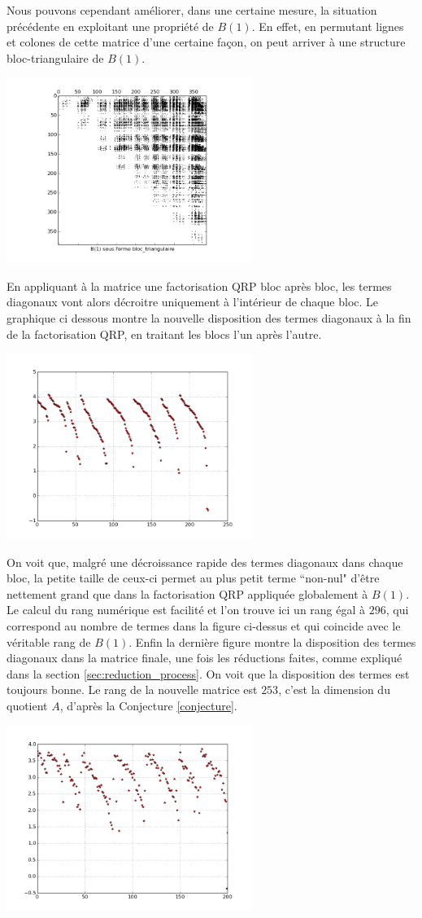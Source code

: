 \documentclass{standalone}
\begin{document}
Nous pouvons cependant améliorer, dans une certaine mesure, la situation précédente en exploitant une propriété de $B(1)$. En effet, en permutant lignes et colones de cette matrice d'une certaine façon, on peut arriver à une structure bloc-triangulaire de $B(1)$.
\begin{center}
\includegraphics[width=8cm]{../png/beztri.png}
\end{center}
En appliquant à la matrice une factorisation QRP bloc après bloc, les termes diagonaux vont alors décroitre uniquement à l'intérieur de chaque bloc. Le graphique ci dessous montre la nouvelle disposition des termes diagonaux à la fin de la factorisation QRP, en traitant les blocs l'un après l'autre.
\begin{center}
\includegraphics[width=8cm]{../png/diagRtri.png}
\end{center}
On voit que, malgré une décroissance rapide des termes diagonaux dans chaque bloc, la petite taille de ceux-ci permet au plus petit terme ``non-nul" d'être nettement grand que dans la factorisation QRP appliquée globalement à $B(1)$. Le calcul du rang numérique est facilité et l'on trouve ici un rang égal à $296$, qui correspond au nombre de termes dans la figure ci-dessus et qui coincide avec le véritable rang de $B(1)$.
Enfin la dernière figure montre la disposition des termes diagonaux dans la matrice finale, une fois les réductions faites, comme expliqué dans la section \ref{sec:reduction_process}. On voit que la disposition des termes est toujours bonne.
 Le rang de la nouvelle matrice est $253$, c'est la dimension du quotient $A$, d'après la Conjecture \ref{conjecture}.
\begin{center}
\includegraphics[width=8cm]{../png/diagRfinal.png}
\end{center}
\end{document}
